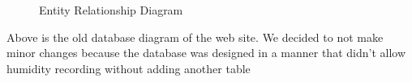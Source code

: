 \documentclass{report}
\begin{document}
\begin{figure}[H]
	\caption{Entity Relationship Diagram}
\end{figure}
\indent
Above is the old database diagram of the web site. We decided to not make minor changes because the database was designed in a manner that didn't allow humidity recording without adding another table
\newpage
\end{document}
